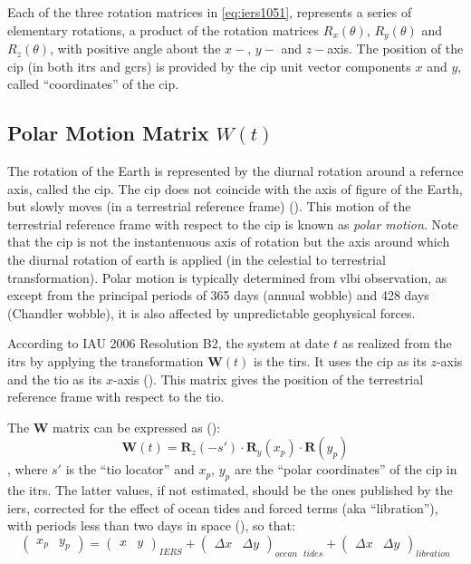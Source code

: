 Each of the three rotation matrices in \ref{eq:iers1051}, represents a series 
of elementary rotations, a product of the rotation matrices $R_x(\theta)$, 
$R_y(\theta)$ and $R_z(\theta)$, with positive angle about the $x-$, $y-$ and 
$z-$axis. The position of the \gls{cip} (in both \gls{itrs} and \gls{gcrs}) is 
provided by the \gls{cip} unit vector components $x$ and $y$, called 
``coordinates'' of the \gls{cip}.

\subsection{Polar Motion Matrix $W(t)$}
\label{ssec:polar-motion-matrix}
The rotation of the Earth is represented by the diurnal rotation around a
refernce axis, called the \gls{cip}. The \gls{cip} does not coincide with 
the axis of figure of the Earth, but slowly moves (in a terrestrial reference 
frame) (\cite{esaa13}). This motion of the terrestrial reference frame 
with respect to the \gls{cip} is known as \emph{polar motion}. Note that the 
\gls{cip} is not the instantenuous axis of rotation but the axis around which the 
diurnal rotation of earth is applied (in the celestial to terrestrial 
transformation). Polar motion is typically determined from \gls{vlbi} 
observation, as except from the principal periods of 365 days (annual wobble) 
and 428 days (Chandler wobble), it is also affected by unpredictable geophysical 
forces.

According to IAU 2006 Resolution B2, the system at date $t$ as realized 
from the \gls{itrs} by applying the transformation $\bm{W}(t)$ is the 
\gls{tirs}. It uses the \gls{cip} as its $z$-axis and the \gls{tio} as 
its $x$-axis (\cite{iers2010}). This matrix gives the position of the 
terrestrial reference frame with respect to the \gls{tio}.

The $\bm{W}$ matrix can be expressed as (\cite{iers2010}):
\begin{equation}
    \bm{W}(t) = \bm{R}_z(-s') \cdot \bm{R}_y(x_p) \cdot \bm{R}(y_p)
    \label{eq:iers1053}
\end{equation},
where $s'$ is the ``\gls{tio} locator'' and $x_p$, $y_p$ are the 
``polar coordinates'' of the \gls{cip} in the \gls{itrs}. The latter values, 
if not estimated, should be the ones published by the \gls{iers}, corrected for 
the effect of ocean tides and forced terms (aka ``libration''), with periods 
less than two days in space (\cite{iers2010}), so that:
\begin{equation}
    \begin{pmatrix} x_p & y_p \end{pmatrix} = 
    \begin{pmatrix} x & y \end{pmatrix}_{IERS} + 
    \begin{pmatrix} \Delta x & \Delta y \end{pmatrix}_{ocean\text{ }tides} + 
    \begin{pmatrix} \Delta x & \Delta y \end{pmatrix}_{libration} 
\end{equation}



